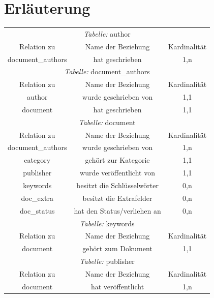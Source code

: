 \section{Erläuterung}
\label{db_erläuterung}

\begin{longtable}{@{}ccc@{}}
  \toprule
  \multicolumn{3}{c}{\emph{Tabelle:} author} \\
  Relation zu & Name der Beziehung & Kardinalität \\
  \cmidrule(lr){1-1}\cmidrule(lr){2-2}\cmidrule(lr){3-3}
  document\_authors & hat geschrieben & 1,n \\
  
  \toprule
  \multicolumn{3}{c}{\emph{Tabelle:} document\_authors} \\
  Relation zu & Name der Beziehung & Kardinalität \\
  \cmidrule(lr){1-1}\cmidrule(lr){2-2}\cmidrule(lr){3-3}
  author & wurde geschrieben von & 1,1 \\
  document & hat geschrieben & 1,1\\

  \toprule
  \multicolumn{3}{c}{\emph{Tabelle:} document} \\
  Relation zu & Name der Beziehung & Kardinalität \\
  \cmidrule(lr){1-1}\cmidrule(lr){2-2}\cmidrule(lr){3-3}
  document\_authors & wurde geschrieben von & 1,n\\
  category & gehört zur Kategorie & 1,1\\
  publisher & wurde veröffentlicht von & 1,1\\
  keywords & besitzt die Schlüsselwörter & 0,n\\  
  doc\_extra & besitzt die Extrafelder & 0,n\\
  doc\_status & hat den Status/verliehen an & 0,n\\

  \toprule
  \multicolumn{3}{c}{\emph{Tabelle:} keywords} \\
  Relation zu & Name der Beziehung & Kardinalität \\
  \cmidrule(lr){1-1}\cmidrule(lr){2-2}\cmidrule(lr){3-3}
  document & gehört zum Dokument & 1,1 \\

  \toprule
  \multicolumn{3}{c}{\emph{Tabelle:} publisher} \\
  Relation zu & Name der Beziehung & Kardinalität \\
  \cmidrule(lr){1-1}\cmidrule(lr){2-2}\cmidrule(lr){3-3}
  document & hat veröffentlicht & 1,n \\


\end{longtable}
